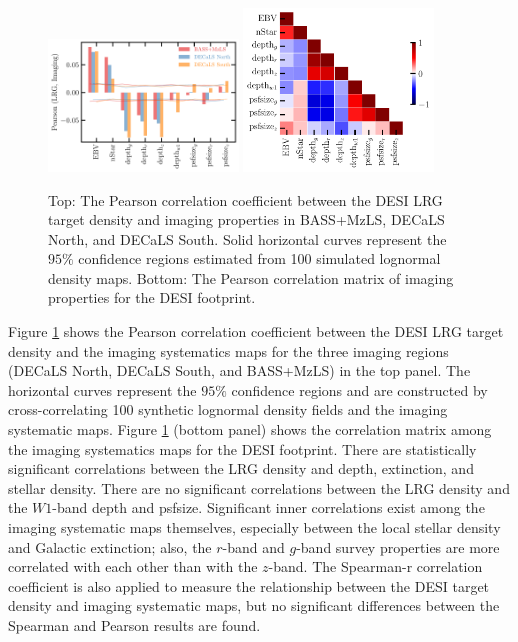 \begin{figure}
\centering
 \includegraphics[width=0.45\textwidth]{figures/pcc.pdf} 
 \includegraphics[width=0.45\textwidth]{figures/pccx.pdf}  
 \caption{Top: The Pearson correlation coefficient between the DESI LRG target density and imaging properties in BASS+MzLS, DECaLS North, and DECaLS South. Solid horizontal curves represent the $95\%$ confidence regions estimated from 100 simulated lognormal density maps. Bottom: The Pearson correlation matrix of imaging properties for the DESI footprint.}
 \label{fig:pcc}
\end{figure}

Figure \ref{fig:pcc} shows the Pearson correlation coefficient between the DESI LRG target density and the imaging systematics maps for the three imaging regions (DECaLS North, DECaLS South, and BASS+MzLS) in the top panel. The horizontal curves represent the $95\%$ confidence regions and are constructed by cross-correlating 100 synthetic lognormal density fields and the imaging systematic maps. Figure \ref{fig:pcc} (bottom panel) shows the correlation matrix among the imaging systematics maps for the DESI footprint. There are statistically significant correlations between the LRG density and depth, extinction, and stellar density. There are no significant correlations between the LRG density and the $W1$-band depth and psfsize. Significant inner correlations exist among the imaging systematic maps themselves, especially between the local stellar density and Galactic extinction; also, the $r$-band and $g$-band survey properties are more correlated with each other than with the $z$-band. The Spearman-r correlation coefficient is also applied to measure the relationship between the DESI target density and imaging systematic maps, but no significant differences between the Spearman and Pearson results are found.

